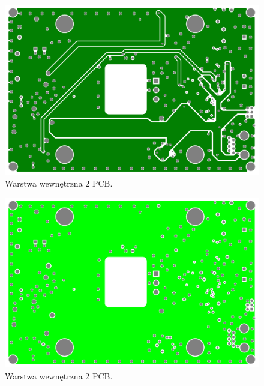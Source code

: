 \begin{figure}
    \begin{center}
        \includegraphics[width = 15cm]{zalaczniki/obciazenie/Obciążenie_aktywne_Strona_10.jpg}
        \caption{Warstwa wewnętrzna 2 PCB.}
    \end{center}
\end{figure}

\begin{figure}
    \begin{center}
        \includegraphics[width = 15cm]{zalaczniki/obciazenie/Obciążenie_aktywne_Strona_11.jpg}
        \caption{Warstwa wewnętrzna 2 PCB.}
    \end{center}
\end{figure}

